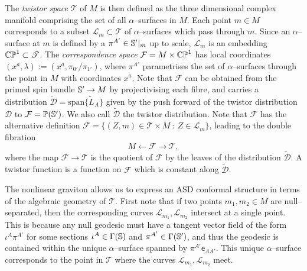 The \textit{twistor space} $\mathscr{T}$ of $M$ is then defined as the three dimensional complex manifold comprising the set of all $\alpha$--surfaces in $M$. Each point $m\in M$ corresponds to a subset $\mathscr{L}_m\subset\mathscr{T}$ of $\alpha$--surfaces which pass through $m$. Since an $\alpha$--surface at $m$ is defined by a $\pi^{A'}\in\mathbb{S}'|_m$ up to scale, $\mathscr{L}_m$ is an embedding $\mathbb{CP}^1\subset\mathscr{T}$. The \textit{correspondence space} $\mathcal{F}=M\times\mathbb{CP}^1$ has local coordinates $(x^a,\lambda):=(x^a,\pi_{0'}/\pi_{1'})$, where $\pi^{A'}$ parametrises the set of $\alpha$--surfaces through the point in $M$ with coordinates $x^a$. Note that $\mathcal{F}$ can be obtained from the primed spin bundle $\mathbb{S}'\rightarrow M$ by projectivising each fibre, and carries a distribution $\tilde{\mathcal{D}}=\mathrm{span}\{\tilde{L}_A\}$ given by the push forward of the twistor distribution $\mathcal{D}$ to $\mathcal{F}=\mathbb{P}(\mathbb{S}')$. We also call $\tilde{\mathcal{D}}$ the twistor distribution. Note that $\mathcal{F}$ has the alternative definition $\mathcal{F}=\{(Z,m)\in \mathscr{T}\times M \ :\  Z\in \mathscr{L}_m\}$, leading to the double fibration
\[
M\leftarrow\mathcal{F}\rightarrow\mathscr{T},
\]
where the map $\mathcal{F}\rightarrow\mathscr{T}$ is the quotient of $\mathcal{F}$ by the leaves of the distribution $\tilde{\mathcal{D}}$. A twistor function is a function on $\mathcal{F}$ which is constant along $\tilde{\mathcal{D}}$. %

The nonlinear graviton allows us to express an ASD conformal structure in terms of the algebraic geometry of $\mathscr{T}$. First note that if two points $m_1,m_2\in M$ are null--separated, then the corresponding curves $\mathscr{L}_{m_1},\mathscr{L}_{m_2}$ intersect at a single point. This is because any null geodesic must have a tangent vector field of the form $\iota^A\pi^{A'}$ for some sections $\iota^A\in\Gamma(\mathbb{S})$ and $\pi^{A'}\in\Gamma(\mathbb{S}')$, and thus the geodesic is contained within the unique $\alpha$--surface spanned by $\pi^{A'}\mathsf{e}_{AA'}$. This unique $\alpha$--surface corresponds to the point in $\mathscr{T}$ where the curves $\mathscr{L}_{m_1},\mathscr{L}_{m_2}$ meet.

